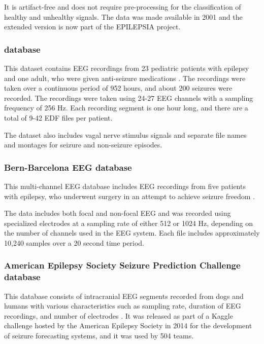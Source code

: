It is artifact-free and does not require pre-processing for the classification of healthy and unhealthy signals. The data was made available in 2001 and the extended version is now part of the EPILEPSIA project.

\subsubsection{ database}
This dataset contains \gls{EEG} recordings from 23 pediatric patients with epilepsy and one adult, who were given anti-seizure medications \cite{shoeb_application_2009, shoeb_chb-mit_2010}. The recordings were taken over a continuous period of 952 hours, and about 200 seizures were recorded. The recordings were taken using 24-27 \gls{EEG} channels with a sampling frequency of 256 Hz. Each recording segment is one hour long, and there are a total of 9-42 \gls{EDF} files per patient. 

The dataset also includes vagal nerve stimulus signals and separate file names and montages for seizure and non-seizure episodes.

\subsubsection{Bern-Barcelona EEG database}
This multi-channel \gls{EEG} database includes \gls{EEG} recordings from five patients with epilepsy, who underwent surgery in an attempt to achieve seizure freedom \cite{andrzejak_nonrandomness_2012}. 

The data includes both focal and non-focal \gls{EEG} and was recorded using specialized electrodes at a sampling rate of either 512 or 1024 Hz, depending on the number of channels used in the \gls{EEG} system. Each file includes approximately 10,240 samples over a 20 second time period.

\subsubsection{American Epilepsy Society Seizure Prediction Challenge database}
This database consists of intracranial \gls{EEG} segments recorded from dogs and humans with various characteristics such as sampling rate, duration of \gls{EEG} recordings, and number of electrodes \cite{howbert_forecasting_2014}. It was released as part of a Kaggle challenge hosted by the American Epilepsy Society in 2014 for the development of seizure forecasting systems, and it was used by 504 teams. 

